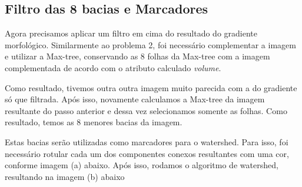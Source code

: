 \documentclass{article}
\begin{document}
	\subsection{Filtro das 8 bacias e Marcadores}	
		
	Agora precisamos aplicar um filtro em cima do resultado do gradiente morfológico. Similarmente ao problema 2, foi necessário complementar a imagem e utilizar a Max-tree, conservando as 8 folhas da Max-tree com a imagem complementada de acordo com o atributo calculado \textit{volume}. 
		
	Como resultado, tivemos outra outra imagem muito parecida com a do gradiente só que filtrada. Após isso, novamente calculamos a Max-tree da imagem resultante do passo anterior e dessa vez selecionamos somente as folhas. Como resultado, temos as 8 menores bacias da imagem.
	
	Estas bacias serão utilizadas como marcadores para o watershed. Para isso, foi necessário rotular cada um dos componentes conexos resultantes com uma cor, conforme imagem (a) abaixo. Após isso, rodamos o algoritmo de watershed, resultando na imagem (b) abaixo
	
\end{document}
